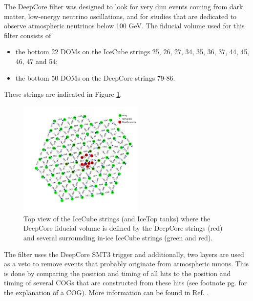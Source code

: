 The DeepCore filter was designed to look for very dim events coming from dark matter, low-energy neutrino oscillations, and for studies that are dedicated to observe atmospheric neutrinos below 100 GeV. The fiducial volume used for this filter consists of
\vspace{2mm}
\begin{itemize}
\item the bottom 22 DOMs on the IceCube strings 25, 26, 27, 34, 35, 36, 37, 44, 45, 46, 47 and 54;
\item the bottom 50 DOMs on the DeepCore strings 79-86.
\end{itemize}
\vspace{2mm}
These strings are indicated in Figure \ref{fig:deepcorestrings}.\\

\begin{figure}[t]
\centering
\includegraphics[width=0.55\textwidth]{chapter8/img/stringview.jpg}
\caption{Top view of the IceCube strings (and IceTop tanks) where the DeepCore fiducial volume is defined by the DeepCore strings (red) and several surrounding in-ice IceCube strings (green and red).}
\label{fig:deepcorestrings}
\end{figure}

\noindent The filter uses the DeepCore SMT3 trigger and additionally, two layers are used as a veto to remove events that probably originate from atmospheric muons. This is done by comparing the position and timing of all hits to the position and timing of several COGs that are constructed from these hits (see footnote pg. \pageref{footnote:cog} for the explanation of a COG). More information can be found in Ref. \cite{DeepCore2012}.

